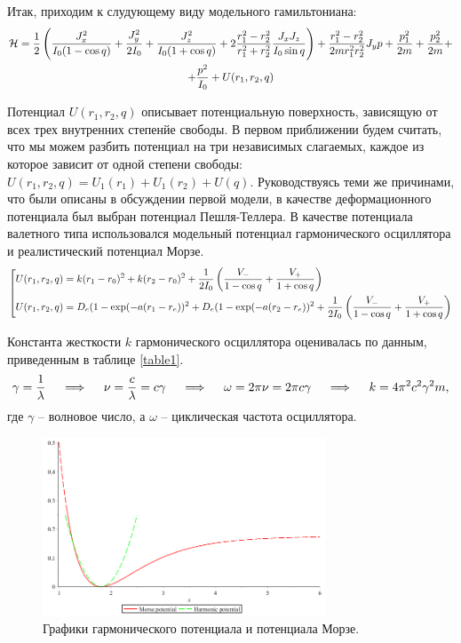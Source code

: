 Итак, приходим к слудующему виду модельного гамильтониана:
\begin{gather}
\mathcal{H} = \frac{1}{2} \left( \frac{J_x^2}{I_0 (1 - \cos q)} + \frac{J_y^2}{2 I_0} + \frac{J_z^2}{I_0 (1 + \cos q)} + 2 \frac{r_1^2 - r_2^2}{r_1^2 + r_2^2} \frac{J_x J_z}{I_0 \sin q} \right) + \frac{r_1^2 - r_2^2}{2m r_1^2 r_2^2} J_y p + \frac{p_1^2}{2m} + \frac{p_2^2}{2m} + \notag \\
+ \frac{p^2}{I_0} + U (r_1, r_2, q) \label{model_ham2}
\end{gather}

Потенциал $U(r_1, r_2, q)$ описывает потенциальную поверхность, зависящую от всех трех внутренних степенйе свободы. В первом приближении будем считать, что мы можем разбить потенциал на три независимых слагаемых, каждое из которое зависит от одной степени свободы: $U(r_1, r_2, q) = U_1 (r_1) + U_1 (r_2) + U (q)$. 
Руководствуясь теми же причинами, что были описаны в обсуждении первой модели, в качестве деформационного потенциала был выбран потенциал Пешля-Теллера. В качестве потенциала валетного типа использовался модельный потенциал гармонического осциллятора и реалистический потенциал Морзе. 
\vverh
\begin{gather}
\left[
\begin{aligned}
U(r_1, r_2, q) &= k (r_1 - r_0)^2 + k (r_2 - r_0)^2 + \frac{1}{2 I_0} \left( \frac{\displaystyle V_{-}}{\displaystyle 1 - \cos q} + \frac{\displaystyle V_{+}}{\displaystyle 1 + \cos q} \right) \\
U(r_1, r_2, q) &= D_e (1 - \exp (- a (r_1 - r_e))^2 + D_e (1 - \exp (- a (r_2 - r_e))^2 + \frac{1}{2 I_0} \left( \frac{\displaystyle V_{-}}{\displaystyle 1 - \cos q} + \frac{\displaystyle V_{+}}{\displaystyle 1 + \cos q} \right) 
\end{aligned}
\right. \notag
\end{gather}

Константа жесткости $k$ гармонического осциллятора оценивалась по данным, приведенным в таблице \eqref{table1}. 
\vverh
\begin{gather}
\gamma = \frac{1}{\lambda} \quad \implies \quad 
\nu = \frac{c}{\lambda} = c \gamma \quad \implies \quad
\omega = 2 \pi \nu = 2 \pi c \gamma \quad \implies \quad
k = 4 \pi^2 c^2 \gamma^2 m , \notag 
\end{gather}
где $\gamma$ -- волновое число, а $\omega$ -- циклическая частота осциллятора.

\begin{figure}[H]
  \centering
	\includegraphics[width=0.75\textwidth]{../pictures/potentials.png}
	\caption{Графики гармонического потенциала и потенциала Морзе.}
\end{figure}


